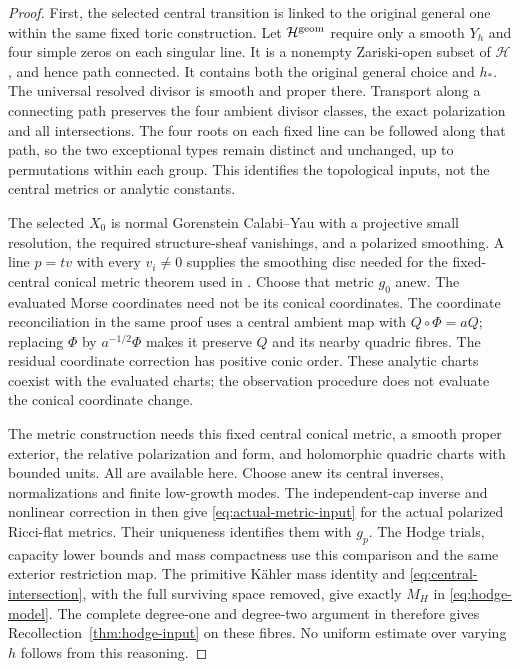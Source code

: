 \begin{proof}
First, the selected central transition is linked to the original
general one within the same fixed toric construction. Let
$\mathcal H^{\rm geom}$ require only a smooth $Y_h$ and four
simple zeros on each singular line. It is a nonempty
Zariski-open subset of $\mathcal H$, and hence path connected.
It contains both the original general choice and $h_*$.
The universal resolved divisor is smooth and proper there.
Transport along a connecting path preserves the four ambient
divisor classes, the exact polarization and all intersections.
The four roots on each fixed line can be followed along that
path, so the two exceptional types remain distinct and unchanged,
up to permutations within each group. This identifies the
topological inputs, not the central metrics or analytic constants.

The selected $X_0$ is normal Gorenstein Calabi--Yau with a
projective small resolution, the required structure-sheaf
vanishings, and a polarized smoothing. A line $p=tv$ with
every $v_i\ne0$ supplies the smoothing disc needed for the
fixed-central conical metric theorem used in
\cite[Section~7]{W_Hodge}. Choose that metric $g_0$ anew.
The evaluated Morse coordinates need not be its conical
coordinates. The coordinate reconciliation in the same proof
uses a central ambient map with $Q\circ\Phi=aQ$; replacing
$\Phi$ by $a^{-1/2}\Phi$ makes it preserve $Q$ and its nearby
quadric fibres. The residual coordinate correction has positive
conic order. These analytic charts coexist with the evaluated
charts; the observation procedure does not evaluate the
conical coordinate change.

The metric construction needs this fixed central conical metric,
a smooth proper exterior, the relative polarization and form,
and holomorphic quadric charts with bounded units. All are
available here. Choose anew its central inverses, normalizations
and finite low-growth modes. The independent-cap inverse and
nonlinear correction in \cite[Sections~7--9]{W_Hodge} then
give \eqref{eq:actual-metric-input} for the actual polarized
Ricci-flat metrics. Their uniqueness identifies them with $g_p$.
The Hodge trials, capacity lower bounds and mass compactness
use this comparison and the same exterior restriction map.
The primitive K\"ahler mass identity and
\eqref{eq:central-intersection}, with the full surviving
space removed, give exactly $M_H$ in \eqref{eq:hodge-model}. The complete
degree-one and degree-two argument in \cite[Sections~10--12]{W_Hodge}
therefore gives Recollection~\ref{thm:hodge-input} on these fibres.
No uniform estimate over varying $h$ follows from this reasoning.


\end{proof}
